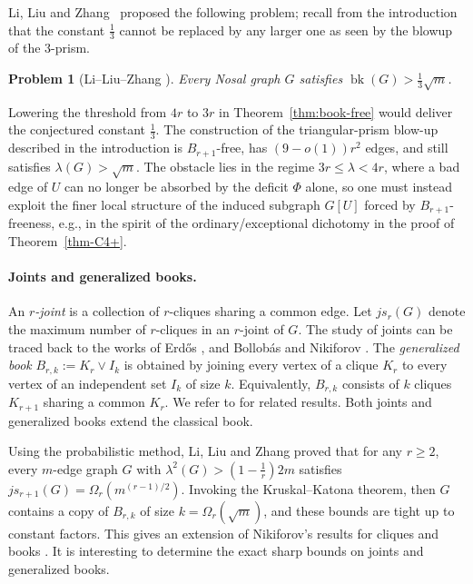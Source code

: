 \documentclass[11pt,a4paper]{article}
\newtheorem{problem}[theorem]{Problem}
\theoremstyle{definition}
\theoremstyle{plain}
\newcommand{\bk}{\operatorname{bk}}
\renewcommand{\le}{\leqslant}
\renewcommand{\ge}{\geqslant}
\begin{document}
\smallskip 
Li, Liu and Zhang~\cite{LiLiuZhang26} proposed the following problem; recall from the introduction that the constant $\frac13$ cannot be replaced by any larger one as seen by the blowup of the $3$-prism. 


\begin{problem}[Li--Liu--Zhang \cite{LiLiuZhang26}]
Every Nosal graph $G$ satisfies $\bk(G)>\tfrac13\sqrt m$.    
\end{problem}

Lowering the threshold from $4r$ to $3r$ in Theorem~\ref{thm:book-free} would deliver the conjectured constant $\frac{1}{3}$. The construction of the triangular-prism blow-up described in the introduction is $B_{r+1}$-free, has $(9-o(1))r^2$ edges, and still satisfies $\lambda(G)>\sqrt m$. 
The obstacle lies in the regime $3r\le\lambda<4r$, where a bad edge of $U$ can no longer be absorbed by the deficit $\Phi$ alone, so one must instead exploit the finer local structure of the induced subgraph $G[U]$ forced by $B_{r+1}$-freeness, e.g., in the spirit of the ordinary/exceptional dichotomy in the proof of Theorem~\ref{thm-C4+}.

 \paragraph{Joints and generalized books.} 
An {\it $r$-joint} is a collection of $r$-cliques sharing a common edge. 
Let $js_r(G)$ denote the maximum number of $r$-cliques in an $r$-joint of $G$. The study of  joints can be traced back to the works of Erd\H{o}s \cite{Erd1969}, and Bollob\'{a}s and Nikiforov \cite{BN2008, BN2011}.  
The {\it generalized book}  $B_{r,k}:=K_r\vee I_k$ is obtained by joining every vertex of a clique $K_r$ to every vertex of an independent set $I_k$ of size $k$. Equivalently, $B_{r,k}$ consists of $k$ cliques $K_{r+1}$ sharing a common $K_r$. We refer to \cite{NR2004, LP2021, CFW2022} for related results. 
Both joints and generalized books extend the classical book. 

\smallskip 
Using the probabilistic method, Li, Liu and Zhang \cite{LiLiuZhang26} proved that for any $r\ge 2$, every $m$-edge graph $G$ 
 with $\lambda^2(G)> (1- \frac{1}{r}) 2m$ satisfies $js_{r+1}(G)=\Omega_r (m^{(r-1)/2})$. Invoking the Kruskal--Katona theorem,  then $G$ contains a copy of $B_{r,k}$ of size $k=\Omega_r(\sqrt{m})$, and these bounds are tight up to constant factors. 
This gives an extension of Nikiforov's results for cliques \cite{Nikiforov2002} and books \cite{Nikiforov21}. 
It is interesting to determine the exact sharp bounds on joints and generalized books.
\end{document}
